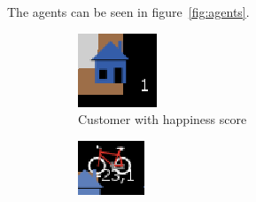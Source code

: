 The agents can be seen in figure~\ref{fig:agents}.
\begin{figure}
     \centering
     \begin{subfigure}[m]{0.1\textwidth}
         \centering
         \includegraphics[width=\textwidth]{sections/pics/cust_happy}
         \caption{Customer with happiness score}
     \end{subfigure}
     \hfill
     \begin{subfigure}[m]{0.1\textwidth}
         \centering
         \includegraphics[width=\textwidth]{sections/pics/del_on_its_way}

\end{subfigure}
\end{figure}
